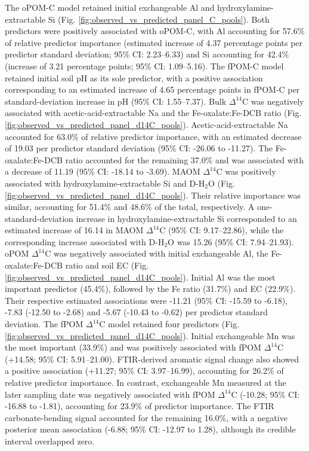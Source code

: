 \documentclass[preprint,12pt]{elsarticle}
\begin{document}
  The oPOM-C model retained initial exchangeable Al and hydroxylamine-extractable Si (Fig. \ref{fig:observed_vs_predicted_panel_C_pools}). Both predictors were positively associated with oPOM-C, with Al accounting for 57.6\% of relative predictor importance (estimated increase of 4.37 percentage points per predictor standard deviation; 95\% CI: 2.23–6.33) and Si accounting for 42.4\% (increase of 3.21 percentage points; 95\% CI: 1.09–5.16). The fPOM-C model retained initial soil pH as its sole predictor, with a positive association corresponding to an estimated increase of 4.65 percentage points in fPOM-C per standard-deviation increase in pH (95\% CI: 1.55–7.37).
  Bulk $\Delta^{14}$C was negatively associated with acetic-acid-extractable Na and the Fe-oxalate:Fe-DCB ratio (Fig. \ref{fig:observed_vs_predicted_panel_d14C_pools}). Acetic-acid-extractable Na accounted for 63.0\% of relative predictor importance, with an estimated decrease of 19.03\textperthousand{} per predictor standard deviation (95\% CI: -26.06 to -11.27). The Fe-oxalate:Fe-DCB ratio accounted for the remaining 37.0\% and was associated with a decrease of 11.19\textperthousand{} (95\% CI: -18.14 to -3.69).
  MAOM $\Delta^{14}$C was positively associated with hydroxylamine-extractable Si and D-H$_2$O  (Fig. \ref{fig:observed_vs_predicted_panel_d14C_pools}). Their relative importance was similar, accounting for 51.4\% and 48.6\% of the total, respectively. A one-standard-deviation increase in hydroxylamine-extractable Si corresponded to an estimated increase of 16.14\textperthousand{} in MAOM $\Delta^{14}$C (95\% CI: 9.17–22.86), while the corresponding increase associated with D-H$_2$O was 15.26\textperthousand{} (95\% CI: 7.94–21.93).
  oPOM $\Delta^{14}$C was negatively associated with initial exchangeable Al, the Fe-oxalate:Fe-DCB ratio and soil EC  (Fig. \ref{fig:observed_vs_predicted_panel_d14C_pools}). Initial Al was the most important predictor (45.4\%), followed by the Fe ratio (31.7\%) and EC (22.9\%). Their respective estimated associations were -11.21\textperthousand{} (95\% CI: -15.59 to -6.18), -7.83\textperthousand{} (-12.50 to -2.68) and -5.67\textperthousand{} (-10.43 to -0.62) per predictor standard deviation.
  The fPOM $\Delta^{14}$C model retained four predictors  (Fig. \ref{fig:observed_vs_predicted_panel_d14C_pools}). Initial exchangeable Mn was the most important (33.9\%) and was positively associated with fPOM $\Delta^{14}$C (+14.58\textperthousand{}; 95\% CI: 5.91–21.00). FTIR-derived aromatic signal change also showed a positive association (+11.27\textperthousand{}; 95\% CI: 3.97–16.99), accounting for 26.2\% of relative predictor importance. In contrast, exchangeable Mn measured at the later sampling date was negatively associated with fPOM $\Delta^{14}$C (-10.28\textperthousand{}; 95\% CI: -16.88 to -1.81), accounting for 23.9\% of predictor importance. The FTIR carbonate-bending signal accounted for the remaining 16.0\%, with a negative posterior mean association (-6.88\textperthousand{}; 95\% CI: -12.97 to 1.28), although its credible interval overlapped zero.
\end{document}
